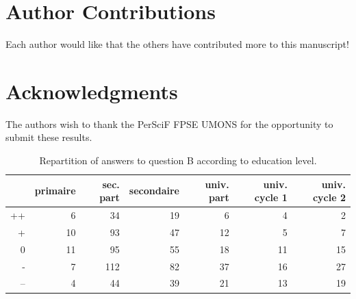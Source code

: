 \documentclass[Afour,times,sageh]{sagej}
\begin{document}
\hypertarget{author-contributions}{%
\section{Author Contributions}\label{author-contributions}}

Each author would like that the others have contributed more to this
manuscript!

\hypertarget{acknowledgments}{%
\section{Acknowledgments}\label{acknowledgments}}

The authors wish to thank the PerSciF FPSE UMONS for the opportunity to
submit these results.

\begin{table}[ht]
\centering
\begin{tabular}{rrrrrrr}
  \hline
 & primaire & sec. part & secondaire & univ. part & univ. cycle 1 & univ. cycle 2 \\ 
  \hline
++ &   6 &  34 &  19 &   6 &   4 &   2 \\ 
  + &  10 &  93 &  47 &  12 &   5 &   7 \\ 
  0 &  11 &  95 &  55 &  18 &  11 &  15 \\ 
  - &   7 & 112 &  82 &  37 &  16 &  27 \\ 
  -- &   4 &  44 &  39 &  21 &  13 &  19 \\ 
   \hline
\end{tabular}
\caption{Repartition of answers to question B according to education level.} 
\label{tab:b_edu}
\end{table}



\end{document}
